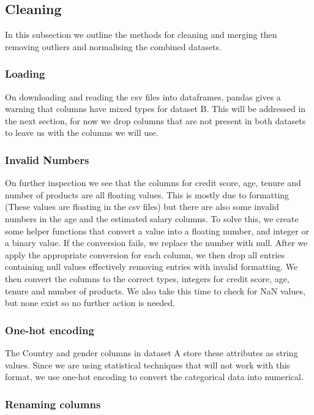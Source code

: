 \documentclass[]{article}
\begin{document}
\subsection{Cleaning}

In this subsection we outline the methods for cleaning and merging then removing outliers and normalising the combined datasets.

\subsubsection{Loading}

On downloading and reading the csv files into dataframes, pandas gives a warning that columns have mixed types for dataset B. This will be addressed in the next section, for now we drop columns that are not present in both datasets to leave us with the columns we will use.

\subsubsection{Invalid Numbers}

On further inspection we see that the columns for credit score, age, tenure and number of products are all floating values. This is mostly due to formatting (These values are floating in the csv files) but there are also some invalid numbers in the age and the estimated salary columns. To solve this, we create some helper functions that convert a value into a floating number, and integer or a binary value. If the conversion fails, we replace the number with null. After we apply the appropriate conversion for each column, we then drop all entries containing null values effectively removing entries with invalid formatting. We then convert the columns to the correct types, integers for credit score, age, tenure and number of products. We also take this time to check for NaN values, but none exist so no further action is needed.

\subsubsection{One-hot encoding}

The Country and gender columns in dataset A store these attributes as string values. Since we are using statistical techniques that will not work with this format, we use one-hot encoding to convert the categorical data into numerical.

\subsubsection{Renaming columns}
\end{document}
